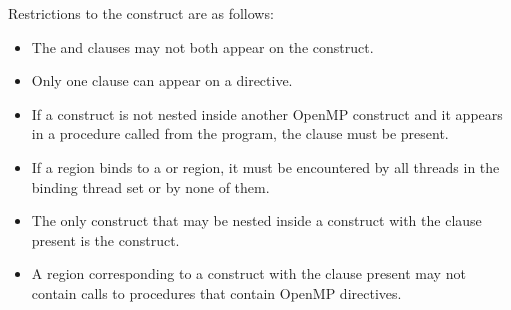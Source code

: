 
\restrictions
Restrictions to the  construct are as follows:

\begin{itemize}

  \item The  and  clauses may not both appear on the
      construct.

  \item Only one  clause can appear on a  directive.

  \item If a  construct is not nested inside another OpenMP
      construct and it appears in a procedure called from the program, the
       clause must be present.

  \item If a  region binds to a  or 
      region, it must be encountered by all threads in the binding thread set
      or by none of them.

  \item The only construct that may be nested inside a  construct
      with the  clause present is the  construct.


  \item A  region corresponding to a  construct with the
       clause present may not contain calls to procedures that contain
    OpenMP directives. %



\end{itemize}
